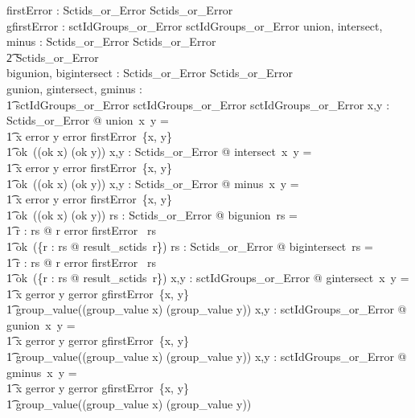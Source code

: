 \documentclass{article}
\begin{document}
\begin{gendef}
   firstError : \power Sctids\_or\_Error \fun Sctids\_or\_Error \\
   gfirstError : \power sctIdGroups\_or\_Error \fun sctIdGroups\_or\_Error
\also
   union, intersect, minus : Sctids\_or\_Error \fun Sctids\_or\_Error \fun \\
\t2 Sctids\_or\_Error \\
   bigunion, bigintersect : \power Sctids\_or\_Error \fun Sctids\_or\_Error \\
\also
   gunion, gintersect, gminus : \\
   \t1 sctIdGroups\_or\_Error \fun sctIdGroups\_or\_Error \fun sctIdGroups\_or\_Error
\where
   \forall x,y : Sctids\_or\_Error @ union~x~y = \\
\t1 \IF x \in \ran error \lor  y \in \ran error \THEN firstError~\{x, y\} \\
\t1 \ELSE ok~((ok \inv x) \cup (ok \inv y))
\also
   \forall x,y : Sctids\_or\_Error @ intersect~x~y = \\
\t1 \IF x \in \ran error \lor y \in \ran error \THEN firstError~\{x, y\} \\
\t1 \ELSE ok~((ok \inv x) \cap (ok \inv y))
\also
   \forall x,y : Sctids\_or\_Error @ minus~x~y = \\
\t1 \IF x \in \ran error \lor y \in \ran error \THEN firstError~\{x, y\} \\
\t1 \ELSE ok~((ok \inv x) \setminus (ok \inv y))
\also
  \forall rs : \power Sctids\_or\_Error @ bigunion~rs = \\
\t1 \IF \exists r : rs @ r \in \ran error \THEN firstError~ rs \\
\t1 \ELSE ok~(\bigcup \{r : rs @ result\_sctids~r\})
\also
  \forall rs : \power Sctids\_or\_Error @ bigintersect~rs = \\
\t1 \IF \exists r : rs @ r \in \ran error \THEN firstError~ rs \\
\t1 \ELSE ok~(\bigcap \{r : rs @ result\_sctids~r\})
\also
   \forall x,y : sctIdGroups\_or\_Error @ gintersect~x~y = \\
\t1 \IF x \in \ran gerror \lor y \in \ran gerror \THEN gfirstError~\{x, y\} \\
\t1 \ELSE group\_value((group\_value \inv x) \cap (group\_value \inv y))
\also
\forall x,y : sctIdGroups\_or\_Error @ gunion~x~y = \\
\t1 \IF x \in \ran gerror \lor y \in \ran gerror \THEN gfirstError~\{x, y\} \\
\t1 \ELSE group\_value((group\_value \inv x) \cup (group\_value \inv y))
\also
\forall x,y : sctIdGroups\_or\_Error @ gminus~x~y = \\
\t1 \IF x \in \ran gerror \lor y \in \ran gerror \THEN gfirstError~\{x, y\} \\
\t1 \ELSE group\_value((group\_value \inv x) \setminus (group\_value \inv y))
\end{gendef}
\pagebreak
\appendix
   
\end{document}
